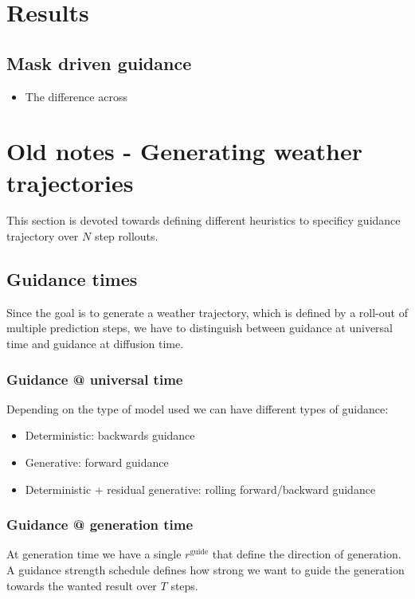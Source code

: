 \documentclass[a4paper,12pt]{article}
\begin{document}
\clearpage
\section{Results}
\subsection{Mask driven guidance}
\begin{itemize}
    \item The difference across
\end{itemize}






\clearpage
\section{Old notes - Generating weather trajectories}

This section is devoted towards defining different heuristics to specificy guidance trajectory over $N$ step rollouts.

\subsection{Guidance times}
Since the goal is to generate a weather trajectory, which is defined by a roll-out of multiple prediction steps, we have to distinguish between guidance at universal time and guidance at diffusion time.

\subsubsection{Guidance @ universal time}

Depending on the type of model used we can have different types of guidance: 
\begin{itemize}
    \item Deterministic: backwards guidance
    \item Generative: forward guidance
    \item Deterministic + residual generative: rolling forward/backward guidance
\end{itemize}

\subsubsection{Guidance @ generation time}
At generation time we have a single $r^\text{guide}$ that define the direction of generation. A guidance strength schedule defines how strong we want to guide the generation towards the wanted result over $T$ steps.
\end{document}
